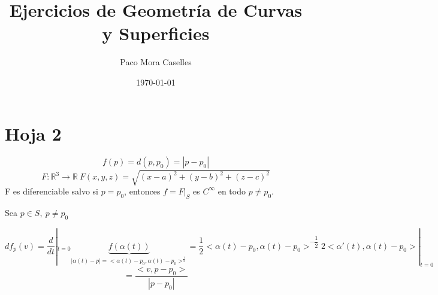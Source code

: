 \documentclass[openany]{book}
\title{Ejercicios de Geometría de Curvas y Superficies}
\author{Paco Mora Caselles}
\date{\today}
\begin{document}
\maketitle

\chapter{Hoja 2}

\setcounter{ex}{1}

\begin{exercise}
    
    $$ f(p) = d(p,p_0) = |p-p_0| $$
    $$ F: \mathbb{R}^3 \to \mathbb{R}\ F(x,y,z) = \sqrt{(x-a)^2+(y-b)^2+(z-c)^2}$$
    F es diferenciable salvo si $ p = p_0 $, entonces $ f = F|_{S} $ es $ C^{\infty} $ en todo $ p \ne p_0 $.

    Sea $  p \in S,\ p \ne p_0 $

    $$ df_{p}(v) = \dfrac{d}{dt}|_{t=0} \underbrace{f(\alpha (t))}_{|\alpha (t)-p| = <\alpha (t)-p_0,\alpha (t)-p_0>^{\frac{1}{2}}} = \dfrac{1}{2} <\alpha (t)-p_0,\alpha (t)-p_0>^{-\dfrac{1}{2}} 2 <\alpha'(t),\alpha(t)-p_0>|_{t=0} $$
    $$ = \dfrac{<v,p-p_0>}{|p-p_0|} $$
\end{exercise}
\end{document}
